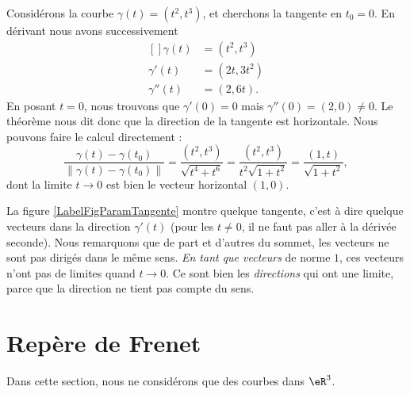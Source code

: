 \begin{example}
    Considérons la courbe $\gamma(t)=(t^2,t^3)$, et cherchons la tangente en $t_0=0$. En dérivant nous avons successivement 
    \begin{equation}
        \begin{aligned}[]
            \gamma(t)&=(t^2,t^3)\\
            \gamma'(t)&=(2t,3t^2)\\
            \gamma''(t)&=(2,6t).
        \end{aligned}
    \end{equation}
    En posant $t=0$, nous trouvons que $\gamma'(0)=0$ mais $\gamma''(0)=(2,0)\neq 0$. Le théorème nous dit donc que la direction de la tangente est horizontale. Nous pouvons faire le calcul directement :
    \begin{equation}
        \frac{ \gamma(t)-\gamma(t_0) }{ \| \gamma(t)-\gamma(t_0) \| }=\frac{ (t^2,t^3) }{ \sqrt{t^4+t^6} }=\frac{ (t^2,t^3) }{ t^2\sqrt{1+t^2} }=\frac{ (1,t) }{ \sqrt{1+t^2} },
    \end{equation}
    dont la limite \( t\to 0\) est bien le vecteur horizontal $(1,0)$.

    La figure \ref{LabelFigParamTangente} montre quelque tangente, c'est à dire quelque vecteurs dans la direction $\gamma'(t)$ (pour les $t\neq 0$, il ne faut pas aller à la dérivée seconde). Nous remarquons que de part et d'autres du sommet, les vecteurs ne sont pas dirigés dans le même sens. \emph{En tant que vecteurs} de norme $1$, ces vecteurs n'ont pas de limites quand $t\to 0$. Ce sont bien les \emph{directions} qui ont une limite, parce que la direction ne tient pas compte du sens.
    \newcommand{\CaptionFigParamTangente}{Quelque tangentes de la courbe $\gamma(t)=(t^2,t^3)$.}
    
 
\end{example}

\section{Repère de Frenet}      \label{SecFrenet}

Dans cette section, nous ne considérons que des courbes dans $\eR^3$.

